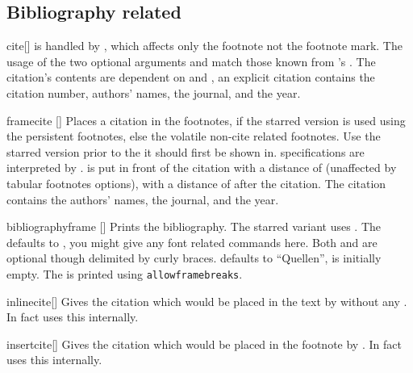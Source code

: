 \subsection{Bibliography related}
\begin{describemacro}{cite}[]
   is handled by , which affects only the footnote not
  the footnote mark. The usage of the two optional arguments and 
  match those known from 's . The citation's contents are
  dependent on  and , an explicit
  citation contains the citation number, authors' names, the journal, and the
  year.
\end{describemacro}

\begin{describemacro}{framecite}%
  [\meta{*}]
  Places a citation in the footnotes, if the starred version is used using the
  persistent footnotes, else the volatile non-cite related footnotes. Use the
  starred version prior to the  it should first be shown in.
   specifications are interpreted by .  is
  put in front of the citation with a distance of \cs{,} (unaffected by tabular
  footnotes options),  with a distance of \cs{,} after the citation.
  The citation contains the authors' names, the journal, and the year.
\end{describemacro}

\begin{describemacro}{bibliographyframe}%
  [\meta{*}]
  Prints the bibliography. The starred variant uses . The
   defaults to , you might give any font related
  commands here. Both  and  are optional though
  delimited by curly braces.  defaults to \enquote{Quellen},
   is initially empty. The  is printed
  using \texttt{allowframebreaks}.
\end{describemacro}

\begin{describemacro}{inlinecite}[]
  Gives the citation which would be placed in the text by  without any
  . In fact  uses this internally.
\end{describemacro}

\begin{describemacro}{insertcite}[]
  Gives the citation which would be placed in the footnote by . In fact
   uses this internally.
\end{describemacro}

